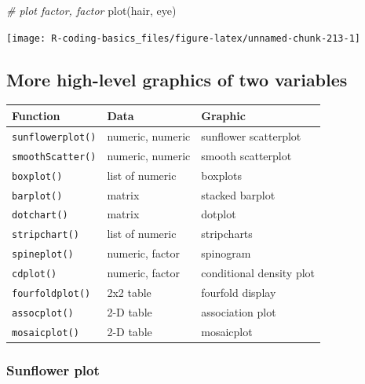 \documentclass[
]{book}
\newenvironment{Shaded}{\begin{snugshade}}{\end{snugshade}}
\newcommand{\CommentTok}[1]{\textcolor[rgb]{0.56,0.35,0.01}{\textit{#1}}}
\newcommand{\FunctionTok}[1]{\textcolor[rgb]{0.00,0.00,0.00}{#1}}
\newcommand{\NormalTok}[1]{#1}
\begin{document}
\begin{Shaded}
\begin{Highlighting}[]
\CommentTok{\# plot factor, factor}
\FunctionTok{plot}\NormalTok{(hair, eye)}
\end{Highlighting}
\end{Shaded}

\begin{center}\texttt{[image: R-coding-basics\_files/figure-latex/unnamed-chunk-213-1]} \end{center}

\hypertarget{more-high-level-graphics-of-two-variables}{%
\subsection{More high-level graphics of two variables}\label{more-high-level-graphics-of-two-variables}}

\begin{longtable}[]{@{}lll@{}}
\toprule()
Function & Data & Graphic \\
\midrule()
\endhead
\texttt{sunflowerplot()} & numeric, numeric & sunflower scatterplot \\
\texttt{smoothScatter()} & numeric, numeric & smooth scatterplot \\
\texttt{boxplot()} & list of numeric & boxplots \\
\texttt{barplot()} & matrix & stacked barplot \\
\texttt{dotchart()} & matrix & dotplot \\
\texttt{stripchart()} & list of numeric & stripcharts \\
\texttt{spineplot()} & numeric, factor & spinogram \\
\texttt{cdplot()} & numeric, factor & conditional density plot \\
\texttt{fourfoldplot()} & 2x2 table & fourfold display \\
\texttt{assocplot()} & 2-D table & association plot \\
\texttt{mosaicplot()} & 2-D table & mosaicplot \\
\bottomrule()
\end{longtable}

\hypertarget{sunflower-plot}{%
\subsubsection*{Sunflower plot}\label{sunflower-plot}}
\end{document}
